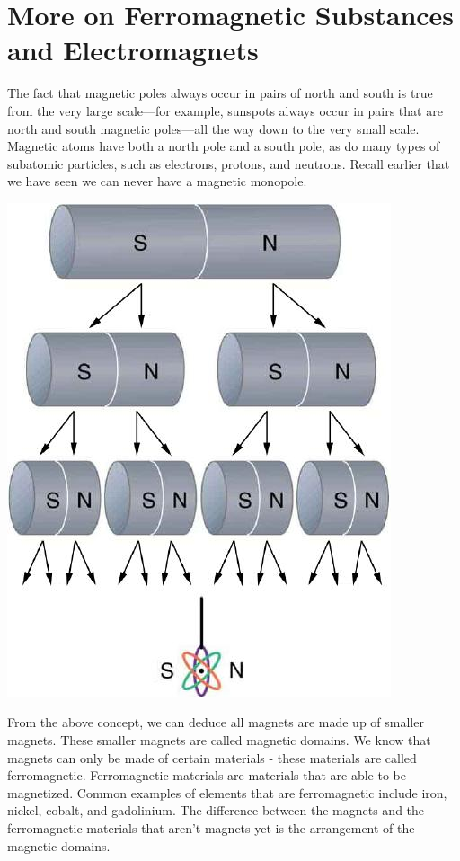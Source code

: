 \documentclass[9pt]{article}
\begin{document}
	\section*{More on Ferromagnetic Substances and Electromagnets}
	The fact that magnetic poles always occur in pairs of north and south is true from the very large scale—for example, sunspots always occur in pairs that are north and south magnetic poles—all the way down to the very small scale. Magnetic atoms have both a north pole and a south pole, as do many types of subatomic particles, such as electrons, protons, and neutrons. Recall earlier that we have seen we can never have a magnetic monopole.
	\begin{center}
		\includegraphics[scale=0.3]{magnets_divided}
	\end{center}
	From the above concept, we can deduce all magnets are made up of smaller magnets. These smaller magnets are called magnetic domains. We know that magnets can only be made of certain materials - these materials are called  ferromagnetic. Ferromagnetic materials are materials that are able to be magnetized. Common examples of elements that are ferromagnetic include iron, nickel, cobalt, and gadolinium. The difference between the magnets and the ferromagnetic materials that aren't magnets yet is the arrangement of the magnetic domains.
\end{document}
